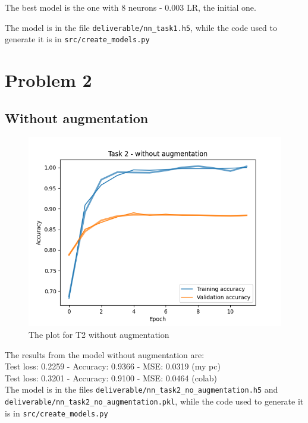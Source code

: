 \documentclass[11pt]{scrartcl}
\begin{document}
	The best model is the one with 8 neurons - 0.003 LR, the initial one.

	The model is in the file \texttt{deliverable/nn\_task1.h5}, while the code used to 
	generate it is in \texttt{src/create\_models.py}


\section*{Problem 2}

	\subsection*{Without augmentation}

		\begin{figure}[H]
			\centering
			\includegraphics[width=\textwidth]{src/plot_task2_no_augmentation.png}
			\caption{The plot for T2 without augmentation}
			\label{fig:plot_T2_1}
		\end{figure}

		The results from the model without augmentation are:\\
		
		Test loss: 0.2259 - Accuracy: 0.9366 - MSE: 0.0319 (my pc)\\
		Test loss: 0.3201 - Accuracy: 0.9100 - MSE: 0.0464 (colab)\\

		The model is in the files \texttt{deliverable/nn\_task2\_no\_augmentation.h5} and\\ 
		\texttt{deliverable/nn\_task2\_no\_augmentation.pkl}, while the code used to generate 
		it is in \texttt{src/create\_models.py}
\end{document}
